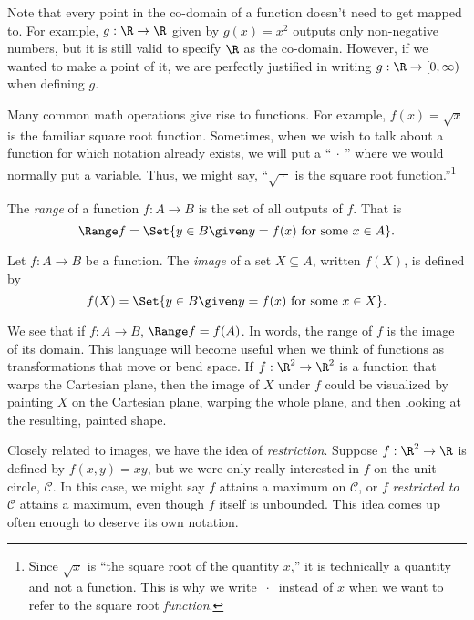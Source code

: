	
	Note that every point in the co-domain of a function doesn't need to get mapped
	to.  For example, $g:\R\to\R$ given by $g(x)=x^2$ outputs only non-negative numbers,
	but it is still valid to specify $\R$ as the co-domain.  However, if we wanted
	to make a point of it, we are perfectly justified in writing $g:\R\to[0,\infty)$
	when defining $g$.

	Many common math operations give rise to functions.  For example,  
	$f(x)=\sqrt{x}$ is the familiar
	square root function.  Sometimes, when we wish to talk about a function
	for which notation already exists, we will put a ``$\ \cdot\ $'' where we would
	normally put a variable.  Thus, we might say, ``$\sqrt{\:\cdot\:}$ is the square
	root function.''\footnote{ Since $\sqrt{x}$ is ``the square root of the quantity
	$x$,'' it is technically a quantity and not a function.  This is why we write $\ \cdot\ $ instead
	of $x$ when we want to refer to the square root \emph{function}.
	}

	\begin{definition}[Range]
		The \emph{range} of a function $f:A\to B$
		is the set of all outputs of $f$. That is
		\[
			\Range f = \Set{y\in B\given y=f(x)\text{ for some }x\in A}.
		\]
	\end{definition}
	\begin{definition}[Image]
		Let $f:A\to B$ be a function.
		The \emph{image} of a set $X\subseteq A$, written $f(X)$, is
		defined by
		\[
			f(X)=\Set{y\in B\given y=f(x)\text{ for some }x\in X}.
		\]
	\end{definition}

	We see that if $f:A\to B$, $\Range f = f(A)$.  In words, the range of $f$ is the image
	of its domain.  This language will become useful when we think of functions as transformations
	that move or bend space.  If $f:\R^2\to\R^2$ is a function that warps the Cartesian plane,
	then the image of $X$ under $f$ could be visualized by painting $X$ on the Cartesian plane,
	warping the whole plane, and then looking at the resulting, painted shape.  


	Closely related to images, we have the idea of \emph{restriction}.
	Suppose $f:\R^2\to\R$ is defined by $f(x,y)=xy$, but we were only really interested in $f$ on the unit circle, $\mathcal C$.
	In this case, we might say $f$ attains a maximum on $\mathcal C$, or $f$ 
	\emph{restricted to} $\mathcal C$ attains a maximum, even though $f$ itself is unbounded.
	This idea comes up often enough to deserve its own notation.

